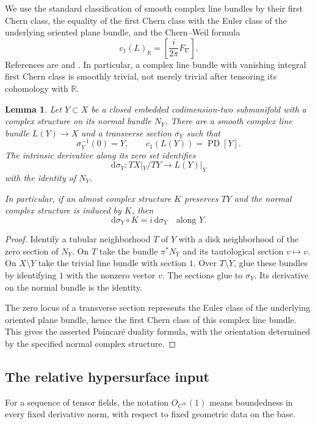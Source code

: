 \documentclass[11pt]{amsart}
\newtheorem{lemma}[theorem]{Lemma}
\theoremstyle{definition}
\theoremstyle{remark}
\newcommand{\R}{\mathbb R}
\newcommand{\dd}{\mathrm d}
\newcommand{\PD}{\operatorname{PD}}
\begin{document}
We use the standard classification of smooth complex line bundles by
their first Chern class, the equality of the first Chern class with
the Euler class of the underlying oriented plane bundle, and the
Chern--Weil formula
\[
c_1(L)_{\R}=\left[\frac{i}{2\pi}F_\nabla\right].
\]
References are \cite[Sections~9 and~14]{MS} and
\cite[Chapter~XII]{KN}.  In particular, a complex line bundle with
vanishing integral first Chern class is smoothly trivial, not merely
trivial after tensoring its cohomology with $\R$.

\begin{lemma}\label{lem:divisor-bundle}
Let $Y\subset X$ be a closed embedded codimension-two submanifold
with a complex structure on its normal bundle $N_Y$.  There are a
smooth complex line bundle $L(Y)\to X$ and a transverse section
$\sigma_Y$ such that
\[
\sigma_Y^{-1}(0)=Y,\qquad c_1(L(Y))=\PD[Y].
\]
The intrinsic derivative along its zero set identifies
\[
\dd\sigma_Y:TX|_Y/TY\longrightarrow L(Y)|_Y
\]
with the identity of $N_Y$.

In particular, if an almost complex structure $K$ preserves $TY$
and the normal complex structure is induced by $K$, then
\[
\dd\sigma_Y\circ K=i\,\dd\sigma_Y
\quad\text{along }Y.
\]
\end{lemma}

\begin{proof}
Identify a tubular neighborhood $T$ of $Y$ with a disk neighborhood
of the zero section of $N_Y$.  On $T$ take the bundle $\pi^*N_Y$
and its tautological section $v\mapsto v$.  On $X\setminus Y$
take the trivial line bundle with section $1$.  Over
$T\setminus Y$, glue these bundles by identifying $1$ with the
nonzero vector $v$.  The sections glue to $\sigma_Y$.
Its derivative on the normal bundle is the identity.

The zero locus of a transverse section represents the Euler class
of the underlying oriented plane bundle, hence the first Chern
class of this complex line bundle.  This gives the asserted
Poincar\'e duality formula, with the orientation determined by
the specified normal complex structure.
\end{proof}

\subsection{The relative hypersurface input}

For a sequence of tensor fields, the notation $O_{C^\infty}(1)$
means boundedness in every fixed derivative norm, with respect to
fixed geometric data on the base.
\end{document}
